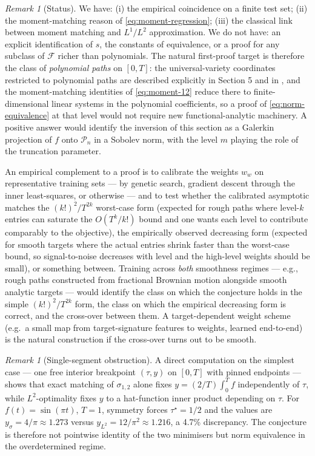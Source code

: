 \documentclass[12pt,english]{article}
\theoremstyle{remark}
\newtheorem{remark}[theorem]{Remark}
\begin{document}
\begin{remark}[Status]
We have: (i) the empirical coincidence on a finite test set; (ii)
the moment-matching reason of \eqref{eq:moment-regression}; (iii)
the classical link between moment matching and $L^{1}/L^{2}$ approximation.
We do not have: an explicit identification of $s$, the constants
of equivalence, or a proof for any subclass of $\mathcal{F}$ richer
than polynomials. The natural first-proof target is therefore the
class of \emph{polynomial paths} on $[0,T]$: the universal-variety
coordinates restricted to polynomial paths are described explicitly
in \cite{varieties} Section 5 and in \cite{learning}, and the moment-matching
identities of \eqref{eq:moment-12} reduce there to finite-dimensional
linear systems in the polynomial coefficients, so a proof of \eqref{eq:norm-equivalence}
at that level would not require new functional-analytic machinery.
A positive answer would identify the inversion of this section as
a Galerkin projection of $f$ onto $\mathcal{P}_{n}$ in a Sobolev
norm, with the level $m$ playing the role of the truncation parameter.

An empirical complement to a proof is to calibrate the weights $w_{w}$
on representative training sets --- by genetic search, gradient descent
through the inner least-squares, or otherwise --- and to test whether
the calibrated asymptotic matches the $(k!)^{2}/T^{2k}$ worst-case
form (expected for rough paths where level-$k$ entries can saturate
the $O(T^{k}/k!)$ bound and one wants each level to contribute comparably
to the objective), the empirically observed decreasing form (expected
for smooth targets where the actual entries shrink faster than the
worst-case bound, so signal-to-noise decreases with level and the
high-level weights should be small), or something between. Training
across \emph{both} smoothness regimes --- e.g., rough paths constructed
from fractional Brownian motion alongside smooth analytic targets ---
would identify the class on which the conjecture holds in the simple
$(k!)^{2}/T^{2k}$ form, the class on which the empirical decreasing
form is correct, and the cross-over between them. A target-dependent
weight scheme (e.g.\ a small map from target-signature features to
weights, learned end-to-end) is the natural construction if the cross-over
turns out to be smooth.
\end{remark}

\begin{remark}[Single-segment obstruction]
\label{rem:single-segment-obstruction}
A direct computation on the simplest case --- one free interior breakpoint
$(\tau,y)$ on $[0,T]$ with pinned endpoints --- shows that exact
matching of $\sigma_{1,2}$ alone fixes $y=(2/T)\int_{0}^{T}f$ independently
of $\tau$, while $L^{2}$-optimality fixes $y$ to a hat-function
inner product depending on $\tau$. For $f(t)=\sin(\pi t)$, $T=1$,
symmetry forces $\tau^{\star}=1/2$ and the values are $y_{\sigma}=4/\pi\approx1.273$
versus $y_{L^{2}}=12/\pi^{2}\approx1.216$, a 4.7\% discrepancy. The
conjecture is therefore not pointwise identity of the two minimisers
but norm equivalence in the overdetermined regime.
\end{remark}
\end{document}
